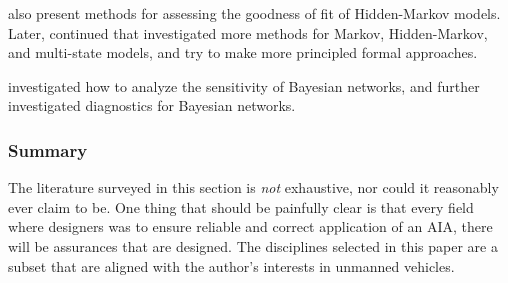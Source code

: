     \cite{MacKay_Altman2004-fl} also present methods for assessing the goodness of fit of Hidden-Markov models. Later, \citet{Titman2008-ct,Titman2012-zw,Titman2010-qx} continued that investigated more methods for Markov, Hidden-Markov, and multi-state models, and try to make more principled formal approaches.

    
    \citet{Laskey1995-jp} investigated how to analyze the sensitivity of Bayesian networks, and \citet{Sinharay2006-yc} further investigated diagnostics for Bayesian networks.

\subsubsection{Summary}
    The literature surveyed in this section is \emph{not} exhaustive, nor could it reasonably ever claim to be. One thing that should be painfully clear is that every field where designers was to ensure reliable and correct application of an AIA, there will be assurances that are designed. The disciplines selected in this paper are a subset that are aligned with the author's interests in unmanned vehicles.

%

